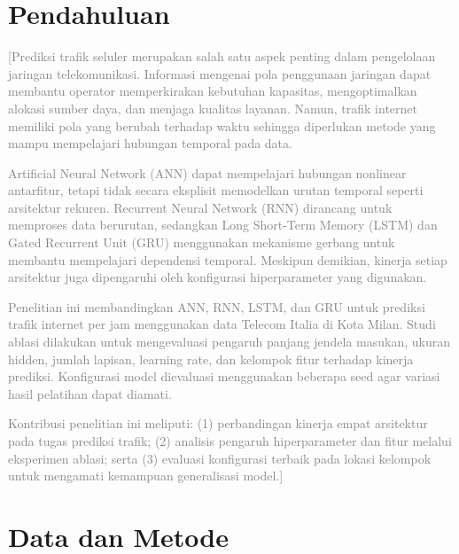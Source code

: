 \documentclass[conference,a4paper]{IEEEtran}
\newcommand{\petunjuk}[1]{\textcolor{gray}{[#1]}}
\begin{document}
\section{Pendahuluan}
\petunjuk{Prediksi trafik seluler merupakan salah satu aspek penting
dalam pengelolaan jaringan telekomunikasi. Informasi mengenai
pola penggunaan jaringan dapat membantu operator memperkirakan
kebutuhan kapasitas, mengoptimalkan alokasi sumber daya, dan
menjaga kualitas layanan. Namun, trafik internet memiliki pola
yang berubah terhadap waktu sehingga diperlukan metode yang
mampu mempelajari hubungan temporal pada data.

Artificial Neural Network (ANN) dapat mempelajari hubungan
nonlinear antarfitur, tetapi tidak secara eksplisit memodelkan
urutan temporal seperti arsitektur rekuren. Recurrent Neural
Network (RNN) dirancang untuk memproses data berurutan,
sedangkan Long Short-Term Memory (LSTM) \cite{hochreiter1997lstm}
dan Gated Recurrent Unit (GRU) \cite{cho2014gru} menggunakan
mekanisme gerbang untuk membantu mempelajari dependensi temporal.
Meskipun demikian, kinerja setiap arsitektur juga dipengaruhi
oleh konfigurasi hiperparameter yang digunakan.

Penelitian ini membandingkan ANN, RNN, LSTM, dan GRU untuk
prediksi trafik internet per jam menggunakan data Telecom Italia
di Kota Milan. Studi ablasi dilakukan untuk mengevaluasi pengaruh
panjang jendela masukan, ukuran hidden, jumlah lapisan,
learning rate, dan kelompok fitur terhadap kinerja prediksi.
Konfigurasi model dievaluasi menggunakan beberapa seed agar
variasi hasil pelatihan dapat diamati.

Kontribusi penelitian ini meliputi: (1) perbandingan kinerja
empat arsitektur pada tugas prediksi trafik; (2) analisis
pengaruh hiperparameter dan fitur melalui eksperimen ablasi;
serta (3) evaluasi konfigurasi terbaik pada lokasi kelompok
untuk mengamati kemampuan generalisasi model.}

\section{Data dan Metode}
\end{document}

